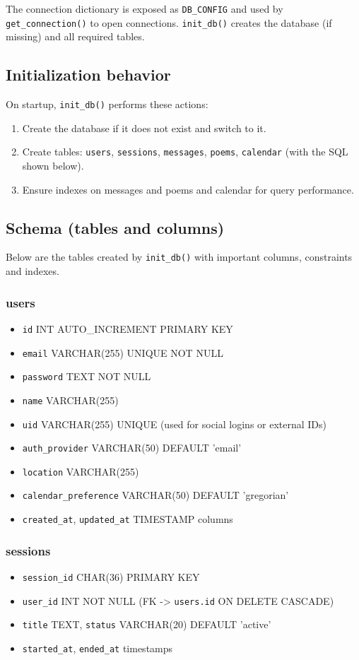 \documentclass[11pt]{article}
\begin{document}
The connection dictionary is exposed as \texttt{DB\_CONFIG} and used by \texttt{get\_connection()} to open connections. \texttt{init\_db()} creates the database (if missing) and all required tables.

\subsection*{Initialization behavior}
On startup, \texttt{init\_db()} performs these actions:
\begin{enumerate}
  \item Create the database if it does not exist and switch to it.
  \item Create tables: \texttt{users}, \texttt{sessions}, \texttt{messages}, \texttt{poems}, \texttt{calendar} (with the SQL shown below).
  \item Ensure indexes on messages and poems and calendar for query performance.
\end{enumerate}

\subsection*{Schema (tables and columns)}
Below are the tables created by \texttt{init\_db()} with important columns, constraints and indexes.

\subsubsection*{users}
\begin{itemize}
  \item \texttt{id} INT AUTO\_INCREMENT PRIMARY KEY
  \item \texttt{email} VARCHAR(255) UNIQUE NOT NULL
  \item \texttt{password} TEXT NOT NULL
  \item \texttt{name} VARCHAR(255)
  \item \texttt{uid} VARCHAR(255) UNIQUE (used for social logins or external IDs)
  \item \texttt{auth\_provider} VARCHAR(50) DEFAULT 'email'
  \item \texttt{location} VARCHAR(255)
  \item \texttt{calendar\_preference} VARCHAR(50) DEFAULT 'gregorian'
  \item \texttt{created\_at}, \texttt{updated\_at} TIMESTAMP columns
\end{itemize}

\subsubsection*{sessions}
\begin{itemize}
  \item \texttt{session\_id} CHAR(36) PRIMARY KEY
  \item \texttt{user\_id} INT NOT NULL (FK -> \texttt{users.id} ON DELETE CASCADE)
  \item \texttt{title} TEXT, \texttt{status} VARCHAR(20) DEFAULT 'active'
  \item \texttt{started\_at}, \texttt{ended\_at} timestamps
\end{itemize}
\end{document}
